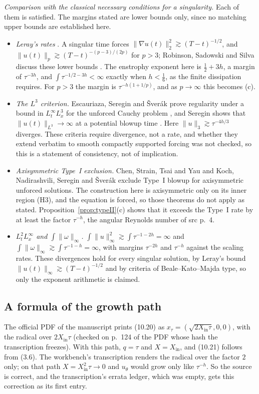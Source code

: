 \emph{Comparison with the classical necessary conditions for a singularity.} Each of them is satisfied. The margins stated are lower bounds only, since no matching upper bounds are established here.
\begin{itemize}
\item \emph{Leray's rates} \cite{Leray}. A singular time forces $\|\nabla u(t)\|_2^2\gtrsim(T-t)^{-1/2}$, and $\|u(t)\|_p\gtrsim(T-t)^{-(p-3)/(2p)}$ for $p>3$; Robinson, Sadowski and Silva discuss these lower bounds \cite{RSS}. The enstrophy exponent here is $\frac12+3h$, a margin of $\tau^{-3h}$, and $\int\tau^{-1/2-3h}<\infty$ exactly when $h<\frac16$, as the finite dissipation requires. For $p>3$ the margin is $\tau^{-h(1+1/p)}$, and as $p\to\infty$ this becomes (c).
\item \emph{The $L^3$ criterion.} Escauriaza, Seregin and Šverák prove regularity under a bound in $L^\infty_tL^3_x$ for the unforced Cauchy problem \cite{ESS}, and Seregin shows that $\|u(t)\|_{L^3}\to\infty$ at a potential blowup time \cite{Seregin}. Here $\|u\|_3\gtrsim\tau^{-4h/3}$ diverges. These criteria require divergence, not a rate, and whether they extend verbatim to smooth compactly supported forcing was not checked, so this is a statement of consistency, not of implication.
\item \emph{Axisymmetric Type~I exclusion.} Chen, Strain, Tsai and Yau \cite{CSTY} and Koch, Nadirashvili, Seregin and Šverák \cite{KNSS} exclude Type~I blowup for axisymmetric unforced solutions. The construction here is axisymmetric only on its inner region (H3), and the equation is forced, so those theorems do not apply as stated. Proposition~\ref{prop:typeII}(c) shows that it exceeds the Type~I rate by at least the factor $\tau^{-h}$, the angular Reynolds number of src p.~4.
\item \emph{$L^2_tL^\infty_x$ and $\int\|\omega\|_\infty$.} $\int\|u\|_\infty^2\gtrsim\int\tau^{-1-2h}=\infty$ and $\int\|\omega\|_\infty\gtrsim\int\tau^{-1-h}=\infty$, with margins $\tau^{-2h}$ and $\tau^{-h}$ against the scaling rates. These divergences hold for every singular solution, by Leray's bound $\|u(t)\|_\infty\gtrsim(T-t)^{-1/2}$ and by criteria of Beale--Kato--Majda type, so only the exponent arithmetic is claimed.
\end{itemize}

\subsection{A formula of the growth path}

The official PDF of the manuscript prints (10.20) as $x_\tau=(\sqrt{2X_{\mathrm{in}}\tau},0,0)$, with the radical over $2X_{\mathrm{in}}\tau$ (checked on p.~124 of the PDF whose hash the transcription freezes). With this path, $q=\tau$ and $X=X_{\mathrm{in}}$, and (10.21) follows from (3.6). The workbench's transcription renders the radical over the factor $2$ only; on that path $X=X_{\mathrm{in}}^2\tau\to0$ and $u_\theta$ would grow only like $\tau^{-h}$. So the source is correct, and the transcription's errata ledger, which was empty, gets this correction as its first entry.
